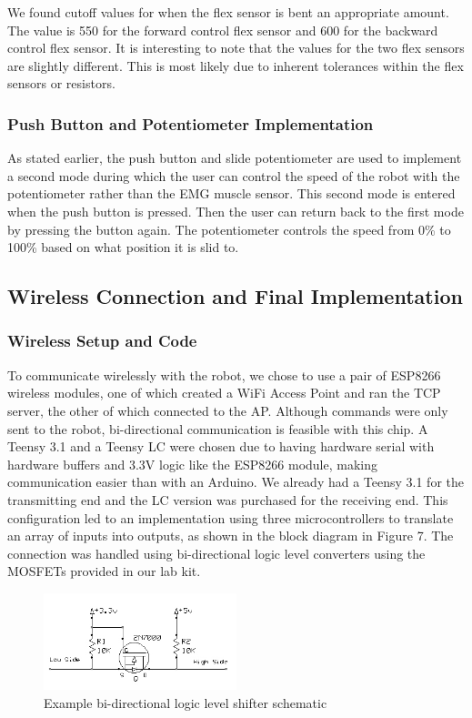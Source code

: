 \documentclass[12pt,scrartcl,titlepage]{article}
\begin{document}
We found cutoff values for when the flex sensor is bent an appropriate amount. The value is 550 for the forward control flex sensor and 600 for the backward control flex sensor. It is interesting to note that the values for the two flex sensors are slightly different. This is most likely due to inherent tolerances within the flex sensors or resistors.

  \subsubsection{Push Button and Potentiometer Implementation}

  As stated earlier, the push button and slide potentiometer are used to implement a second mode during which the user can control the speed of the robot with the potentiometer rather than the EMG muscle sensor. This second mode is entered when the push button is pressed. Then the user can return back to the first mode by pressing the button again. The potentiometer controls the speed from 0\% to 100\% based on what position it is slid to.
  
  \subsection{Wireless Connection and Final Implementation}

  \subsubsection{Wireless Setup and Code}

To communicate wirelessly with the robot, we chose to use a pair of ESP8266 wireless modules, one of which created a WiFi Access Point and ran the TCP server, the other of which connected to the AP. Although commands were only sent to the robot, bi-directional communication is feasible with this chip. A Teensy 3.1 and a Teensy LC were chosen due to having hardware serial with hardware buffers and 3.3V logic like the ESP8266 module, making communication easier than with an Arduino. We already had a Teensy 3.1 for the transmitting end and the LC version was purchased for the receiving end. This configuration led to an implementation using three microcontrollers to translate an array of inputs into outputs, as shown in the block diagram in Figure 7. The connection was handled using bi-directional logic level converters using the MOSFETs provided in our lab kit.

\begin{figure}[h!]
  \centering
  \includegraphics[width=0.5\textwidth]{level-shifter.png}
  \caption{Example bi-directional logic level shifter schematic}
\end{figure}
\end{document}
